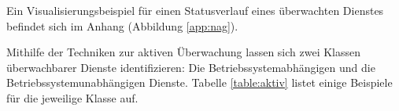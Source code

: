 \begin{table}[ht]
    \caption{Statusübersicht}
    \label{table:status}\vspace{0.2cm}

\end{table}
Ein Visualisierungsbeispiel für einen Statusverlauf eines überwachten Dienstes befindet 
sich im Anhang (Abbildung \ref{app:nag}).

\newpage
Mithilfe der Techniken zur aktiven Überwachung lassen sich zwei Klassen überwachbarer 
Dienste identifizieren: Die Betriebssystemabhängigen und die Betriebssystemunabhängigen 
Dienste. Tabelle \ref{table:aktiv} listet einige Beispiele für die jeweilige Klasse auf.


